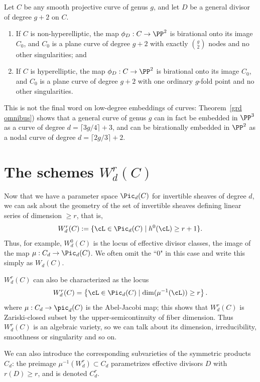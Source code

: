 \begin{theorem}[$g+2$ theorem]\label{g+2 theorem}
Let $C$ be any smooth projective curve of genus $g$, and let $D$ be a general divisor of degree $g+2$ on $C$. 
\begin{enumerate}
\item If $C$ is non-hyperelliptic, the map $\phi_D : C \to \PP^2$ is birational onto its image $C_0$, and $C_0$ is a plane curve of degree $g+2$ with exactly $\binom{g}{2}$ nodes and no other singularities; and
\item If $C$ is hyperelliptic, the map $\phi_D : C \to \PP^2$ is birational onto its image $C_0$, and $C_0$ is a plane curve of degree $g+2$ with one ordinary $g$-fold point and no other singularities.
\end{enumerate}
\end{theorem}

This is not the final word on low-degree embeddings of curves: Theorem~\ref{grd omnibus}) shows that a general curve of genus $g$ can in fact be embedded in $\PP^{3}$ as a curve of degree $d = \lceil 3g/4 \rceil + 3$, and can be birationally embedded in $\PP^2$ as a nodal curve of degree $d = \lceil 2g/3 \rceil + 2$.

\section{The schemes $W^r_d(C)$}

Now that we have a parameter space $\Pic_d(C)$ for invertible sheaves of degree $d$, we can ask about the geometry of the set of invertible sheaves defining linear series of dimension $\geq r$, that is,
$$
W^r_d(C) := \{ \cL \in \Pic_d(C) \mid h^0(\cL) \geq r+1 \}.
$$
Thus, for example, $W^0_d(C)$ is the locus of effective divisor classes, the image of the map $\mu : C_d \to \Pic_d(C)$. We often omit the ``0" in this case and write this simply as $W_d(C)$.

$W^r_d(C)$ can also be characterized as the locus
$$
W^r_d(C) = \left\{ \cL \in \Pic_d(C) \mid \dim(\mu^{-1}(\cL)) \geq r \right\}.
$$
where $\mu : C_d \to \pic_d(C)$ is the Abel-Jacobi map; this shows that $W^r_d(C)$ is Zariski-closed subset by the upper-semicontinuity of fiber dimension.
Thus $W^r_d(C)$ is an algebraic variety, so we can talk about its dimension, irreducibility, smoothness or singularity and so on.

We can also introduce the corresponding subvarieties of the symmetric products $C_d$: the preimage $\mu^{-1}(W^r_d) \subset C_d$ parametrizes effective divisors $D$ with $r(D) \geq r$, and is denoted $C^r_d$.

